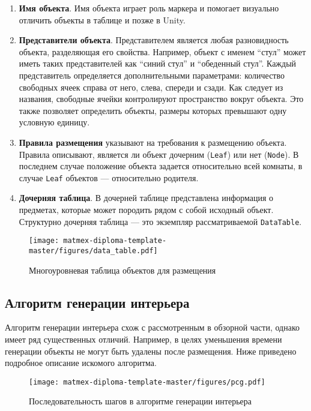 \begin{enumerate}

    \item \textbf{Имя объекта}. Имя объекта играет роль маркера и помогает визуально отличить объекты в таблице и позже в Unity. 

    \item \textbf{Представители объекта}. Представителем является любая разновидность объекта, разделяющая его свойства. Например, объект с именем \enquote{стул} может иметь таких представителей как \enquote{синий стул} и \enquote{обеденный стул}. Каждый представитель определяется дополнительными параметрами: количество свободных ячеек справа от него, слева, спереди и сзади. Как следует из названия, свободные ячейки контролируют пространство вокруг объекта. Это также позволяет определить объекты, размеры которых превышают одну условную единицу.

    \item \textbf{Правила размещения} указывают на требования к размещению объекта. Правила описывают, является ли объект дочерним (\texttt{Leaf}) или нет (\texttt{Node}). В последнем случае положение объекта задается относительно всей комнаты, в случае \texttt{Leaf} объектов --- относительно родителя.

    \item \textbf{Дочерняя таблица}. В дочерней таблице представлена информация о предметах, которые может породить рядом с собой исходный объект. Структурно дочерняя таблица --- это экземпляр рассматриваемой \texttt{DataTable}. 
    
\end{enumerate}

\begin{figure}
    \centering
    \texttt{[image: matmex-diploma-template-master/figures/data\_table.pdf]}
    \caption{Многоуровневая таблица объектов для размещения}
    \label{fig:data_table}
\end{figure}

\subsection{Алгоритм генерации интерьера}
Алгоритм генерации интерьера схож с рассмотренным в обзорной части, однако имеет ряд существенных отличий. Например, в целях уменьшения времени генерации объекты не могут быть удалены после размещения. Ниже приведено подробное описание искомого алгоритма. 

\begin{figure}
    \centering
    \texttt{[image: matmex-diploma-template-master/figures/pcg.pdf]}
    \caption{Последовательность шагов в алгоритме генерации интерьера}
    \label{fig:pcg}
\end{figure}


